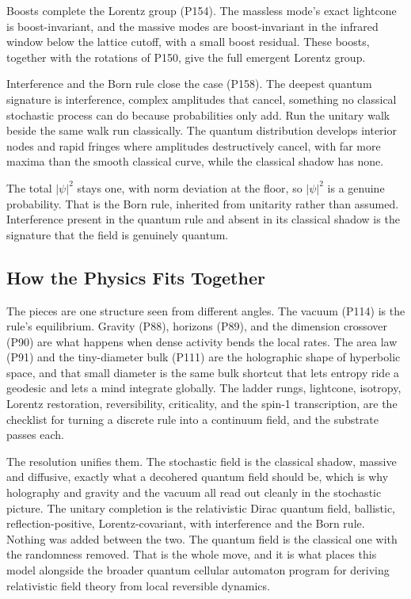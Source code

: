 Boosts complete the Lorentz group (P154). The massless mode's exact lightcone is boost-invariant, and the massive modes are boost-invariant in the infrared window below the lattice cutoff, with a small boost residual. These boosts, together with the rotations of P150, give the full emergent Lorentz group.

Interference and the Born rule close the case (P158). The deepest quantum signature is interference, complex amplitudes that cancel, something no classical stochastic process can do because probabilities only add. Run the unitary walk beside the same walk run classically. The quantum distribution develops interior nodes and rapid fringes where amplitudes destructively cancel, with far more maxima than the smooth classical curve, while the classical shadow has none.

The total $|\psi|^2$ stays one, with norm deviation at the floor, so $|\psi|^2$ is a genuine probability. That is the Born rule, inherited from unitarity rather than assumed. Interference present in the quantum rule and absent in its classical shadow is the signature that the field is genuinely quantum.

\subsection{How the Physics Fits Together}

The pieces are one structure seen from different angles. The vacuum (P114) is the rule's equilibrium. Gravity (P88), horizons (P89), and the dimension crossover (P90) are what happens when dense activity bends the local rates. The area law (P91) and the tiny-diameter bulk (P111) are the holographic shape of hyperbolic space, and that small diameter is the same bulk shortcut that lets entropy ride a geodesic and lets a mind integrate globally. The ladder rungs, lightcone, isotropy, Lorentz restoration, reversibility, criticality, and the spin-1 transcription, are the checklist for turning a discrete rule into a continuum field, and the substrate passes each.

The resolution unifies them. The stochastic field is the classical shadow, massive and diffusive, exactly what a decohered quantum field should be, which is why holography and gravity and the vacuum all read out cleanly in the stochastic picture. The unitary completion is the relativistic Dirac quantum field, ballistic, reflection-positive, Lorentz-covariant, with interference and the Born rule. Nothing was added between the two. The quantum field is the classical one with the randomness removed. That is the whole move, and it is what places this model alongside the broader quantum cellular automaton program for deriving relativistic field theory from local reversible dynamics.
